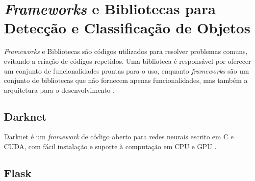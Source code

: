 
\section{\textit{Frameworks} e Bibliotecas para Detecção e Classificação de Objetos} \label{cap:fund-frameworks}
\textit{Frameworks} e Bibliotecas são códigos utilizados para resolver problemas comuns, evitando a criação de códigos repetidos. Uma biblioteca é responsável por oferecer um conjunto de funcionalidades prontas para o uso, enquanto \textit{frameworks} são um conjunto de bibliotecas que não fornecem apenas funcionalidades, mas também a arquitetura para o desenvolvimento \cite{ref:Tamenaoul}.


\subsection{Darknet} \label{cap:fund-frameworks-darknet}
Darknet é um \textit{framework} de código aberto para redes neurais escrito em C e CUDA, com fácil instalação e suporte à computação em CPU e GPU \cite{ref:Redmon}.

\subsection{Flask} \label{cap:fund-frameworks-flask}
